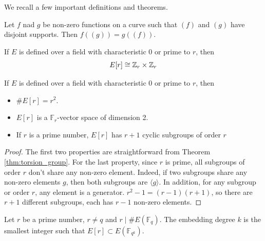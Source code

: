 We recall a few important definitions and theorems.

\begin{theorem}
	Let $f$ nad $g$ be non-zero functions on a curve such that $(f)$ and $(g)$ have disjoint supports. Then $f((g)) = g((f))$.
\end{theorem}


\begin{theorem}
\label{thm:torsion_group}
If $E$ is defined over a field with characteristic $0$ or prime to $r$, then
\[
	E[r] \cong \mathbb{Z}_r \times \mathbb{Z}_r
\]
\end{theorem}

\begin{corollary}
If $E$ is defined over a field with characteristic $0$ or prime to $r$, then
\begin{itemize}
	\item $\#E[r] = r^2$.
	\item $E[r]$ is a $\mathbb{F}_r$-vector space of dimension 2.
	\item If $r$ is a prime number, $E[r]$ has $r+1$ cyclic subgroups of order $r$
\end{itemize}
\end{corollary}

\begin{proof}
	The first two properties are straightforward from Theorem \ref{thm:torsion_group}. For the last property, since $r$ is prime, all subgroups of order $r$ don’t share any non-zero element. Indeed, if two subgroups share any non-zero elements $g$, then both subgroups are $\langle g\rangle$. In addition, for any subgroup or order $r$, any element is a generator. $r^2 - 1 = (r-1)(r+1)$, so there are $r+1$ different subgroups, each has $r-1$ non-zero elements.

\end{proof}

\begin{theorem}
\label{thm:embedding_degree}

Let $r$ be a prime number, $r \neq q$ and $r \mid \#E(\mathbb{F}_q)$. The embedding degree $k$ is the smallest integer such that $E[r] \subset E(\mathbb{F}_{q^k})$.

\end{theorem}

